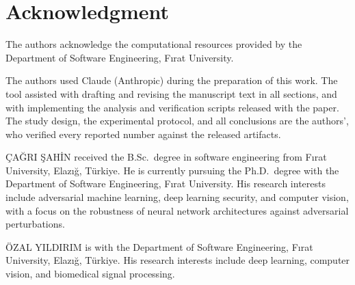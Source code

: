 \documentclass{ieeeaccess}
\begin{document}
\section*{Acknowledgment}
The authors acknowledge the computational resources provided by the Department of Software Engineering, F{\i}rat University.

The authors used Claude (Anthropic) during the preparation of this work. The tool assisted with drafting and revising the manuscript text in all sections, and with implementing the analysis and verification scripts released with the paper. The study design, the experimental protocol, and all conclusions are the authors', who verified every reported number against the released artifacts.




\begin{IEEEbiographynophoto}{\c{C}A\u{G}RI \c{S}AH\.IN}
received the B.Sc.\ degree in software engineering from F{\i}rat University, Elaz{\i}\u{g}, T\"urkiye. He is currently pursuing the Ph.D.\ degree with the Department of Software Engineering, F{\i}rat University. His research interests include adversarial machine learning, deep learning security, and computer vision, with a focus on the robustness of neural network architectures against adversarial perturbations.
\end{IEEEbiographynophoto}

\begin{IEEEbiographynophoto}{\"OZAL YILDIRIM}
is with the Department of Software Engineering, F{\i}rat University, Elaz{\i}\u{g}, T\"urkiye. His research interests include deep learning, computer vision, and biomedical signal processing.
\end{IEEEbiographynophoto}

\EOD
\end{document}
